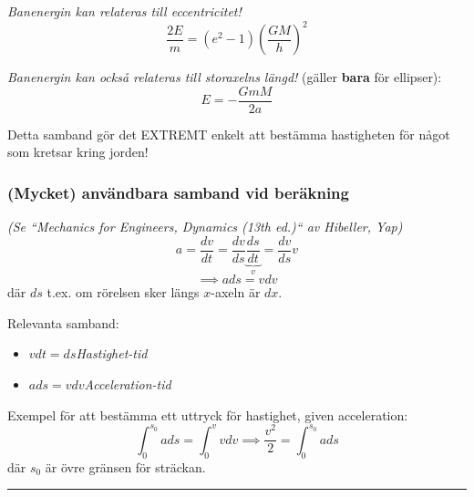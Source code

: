 \documentclass{article}
\newenvironment{ankiflashcard}[1]{}{}
\newcommand{\ruler}{
\rule{0.5\textwidth}{0.5pt}
}
\begin{document}
\begin{paracol}{2}
\begin{ankiflashcard}{Formulera formeln för banenergi kopplat till eccentricitet.}
    
\textit{Banenergin kan relateras till eccentricitet!}
$$\frac{2E}{m}=(e^2-1)\left( \frac{GM}{h}\right)^2$$
\end{ankiflashcard}


\begin{ankiflashcard}{Relatera banenergi till storaxelns längd.}
    
\textit{Banenergin kan också relateras till storaxelns längd!} (gäller \textbf{bara} för ellipser):
$$
E = -\frac{GmM}{2a}
$$

\small{Detta samband gör det EXTREMT enkelt att bestämma hastigheten för något som kretsar kring jorden!}
\end{ankiflashcard}

\switchcolumn

\begin{ankiflashcard}{Formulera en integral för att bestämma ett uttryck för hastighet utifrån acceleration.}
\subsubsection{(Mycket) användbara samband vid beräkning}
\textit{(Se ``Mechanics for Engineers, Dynamics (13th ed.)`` av Hibeller, Yap)}
$$
a=\frac{dv}{dt}=\frac{dv}{ds}\underbrace{\frac{ds}{dt}}_{v} = \frac{dv}{ds}v
$$
$$
\implies \boxed{a ds = v dv}
$$
där $ds$ t.ex. om rörelsen sker längs $x$-axeln är $dx$.
\end{ankiflashcard}
    
\begin{ankiflashcard}{Ange Hastighet-tid, Acceleration-tid och Hastighet-position samband.}
Relevanta samband:
\begin{itemize}
    \item $vdt = ds$\quad\textit{Hastighet-tid}
    \item $ads = vdv$\quad\textit{Acceleration-tid}
\end{itemize}
Exempel för att bestämma ett uttryck för hastighet, given acceleration:
$$\int_0^{s_0} a ds = \int_0^v v dv\implies \frac{v^2}{2} = \int_0^{s_0} a ds$$
där $s_0$ är övre gränsen för sträckan.
\end{ankiflashcard}

\ruler

\end{paracol}
\end{document}
